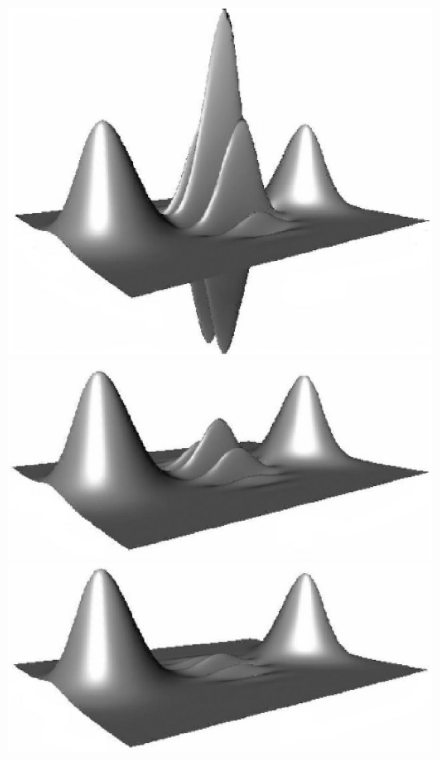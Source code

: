 \documentclass[12pt,aps,floatfix,amsmath,amssymb,showpacs,nofootinbib]{revtex4-2}
\begin{document}
\begin{figure}
\begin{center}
 \includegraphics[scale=.2]{squid-dec1-n.eps}

 \includegraphics[scale=.2]{squid-dec2-n.eps}

 \includegraphics[scale=.2]{squid-dec3-n.eps}


\end{center}
\end{figure}
\end{document}
